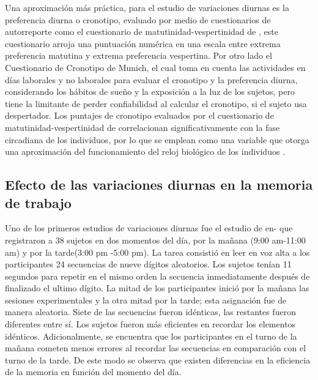 \documentclass[12pt,letterpaper,final]{article}
\let\cite\cite %
\begin{document}
Una aproximación más práctica, para el estudio de variaciones diurnas es la preferencia diurna o cronotipo,  evaluado por medio de cuestionarios de autorreporte como el cuestionario de matutinidad-vespertinidad de , este cuestionario arroja una puntuación numérica en una escala entre extrema preferencia matutina y extrema preferencia vespertina. Por otro lado el Cuestionario de Cronotipo de Munich, el cual toma en cuenta las actividades en días laborales y no laborales para evaluar el cronotipo y la preferencia diurna, considerando los hábitos de sueño y la exposición a la luz de los sujetos, pero tiene la limitante de perder confiabilidad al calcular el cronotipo, si el sujeto usa despertador. Los puntajes de cronotipo evaluados por el  cuestionario de matutinidad-vespertinidad de  correlacionan significativamente con la fase circadiana de los individuos, por lo que se emplean como una variable que otorga una aproximación del funcionamiento del reloj biológico de los individuos \cite{Duffy,VonSchantz2015}.

\subsection{Efecto de las variaciones diurnas en la memoria de trabajo}

Uno de los primeros estudios de variaciones diurnas fue el estudio de   en- que registraron a 38 sujetos en dos momentos del día, por la mañana (9:00 am-11:00 am)  y por la tarde(3:00 pm -5:00 pm). La tarea consistió en leer en voz alta a los participantes 24 secuencias de nueve dígitos aleatorios. Los sujetos tenían 11 segundos para repetir en el mismo orden la secuencia inmediatamente después de finalizado el ultimo dígito. La mitad de los participantes inició por la mañana las sesiones experimentales y la otra mitad por la tarde; esta asignación fue de manera aleatoria. Siete de las secuencias fueron idénticas, las restantes fueron diferentes entre sí. Los sujetos fueron más eficientes en recordar los elementos idénticos.
Adicionalmente, se encuentra que los participantes en el turno de la mañana cometen menos errores al recordar las secuencias en comparación con el turno de la tarde.
De este modo se observa que existen diferencias en la eficiencia de la memoria en función del momento del día.
\end{document}
